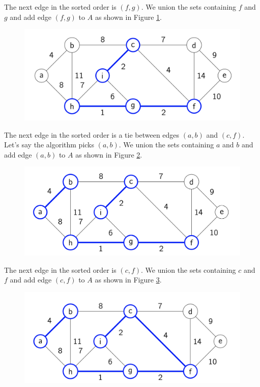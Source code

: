 \documentclass [12pt]{article}
\theoremstyle{definition}
\begin{document}
The next edge in the sorted order is $(f , g)$. We union the sets containing $f$ and $g$ and add edge $(f , g)$ to $ A$ as shown in Figure \ref{fig:kruskal3}.


\begin{figure}[h!]
\centering
\includegraphics[scale=0.8]{kruskal3.png}
\caption{}
\label{fig:kruskal3}
\end{figure}

The next edge in the sorted order is a tie between edges $(a, b)$ and $(c, f )$. Let's say the
algorithm picks $(a, b)$. We union the sets containing $a$ and $b$ and add edge $(a, b)$ to $A$ as shown in Figure \ref{fig:kruskal4}.

\begin{figure}[h!]
\centering
\includegraphics[scale=0.8]{kruskal4.png}
\caption{}
\label{fig:kruskal4}
\end{figure}


The next edge in the sorted order is $(c, f )$. We union the sets containing $c$ and $f$ and add edge $(c, f )$ to $A$ as shown in Figure \ref{fig:kruskal5}.

\begin{figure}[h!]
\centering
\includegraphics[scale=0.8]{kruskal5.png}
\caption{}
\label{fig:kruskal5}
\end{figure}
\end{document}
